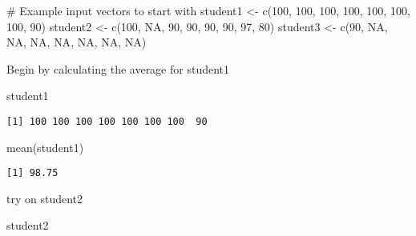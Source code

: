 \documentclass[
  letterpaper,
  DIV=11,
  numbers=noendperiod]{scrartcl}
\newenvironment{Shaded}{\begin{snugshade}}{\end{snugshade}}
\newcommand{\CommentTok}[1]{\textcolor[rgb]{0.37,0.37,0.37}{#1}}
\newcommand{\ConstantTok}[1]{\textcolor[rgb]{0.56,0.35,0.01}{#1}}
\newcommand{\DecValTok}[1]{\textcolor[rgb]{0.68,0.00,0.00}{#1}}
\newcommand{\FunctionTok}[1]{\textcolor[rgb]{0.28,0.35,0.67}{#1}}
\newcommand{\NormalTok}[1]{\textcolor[rgb]{0.00,0.23,0.31}{#1}}
\newcommand{\OtherTok}[1]{\textcolor[rgb]{0.00,0.23,0.31}{#1}}
\begin{document}
\begin{Shaded}
\begin{Highlighting}[]
\CommentTok{\# Example input vectors to start with}
\NormalTok{student1 }\OtherTok{\textless{}{-}} \FunctionTok{c}\NormalTok{(}\DecValTok{100}\NormalTok{, }\DecValTok{100}\NormalTok{, }\DecValTok{100}\NormalTok{, }\DecValTok{100}\NormalTok{, }\DecValTok{100}\NormalTok{, }\DecValTok{100}\NormalTok{, }\DecValTok{100}\NormalTok{, }\DecValTok{90}\NormalTok{)}
\NormalTok{student2 }\OtherTok{\textless{}{-}} \FunctionTok{c}\NormalTok{(}\DecValTok{100}\NormalTok{, }\ConstantTok{NA}\NormalTok{, }\DecValTok{90}\NormalTok{, }\DecValTok{90}\NormalTok{, }\DecValTok{90}\NormalTok{, }\DecValTok{90}\NormalTok{, }\DecValTok{97}\NormalTok{, }\DecValTok{80}\NormalTok{)}
\NormalTok{student3 }\OtherTok{\textless{}{-}} \FunctionTok{c}\NormalTok{(}\DecValTok{90}\NormalTok{, }\ConstantTok{NA}\NormalTok{, }\ConstantTok{NA}\NormalTok{, }\ConstantTok{NA}\NormalTok{, }\ConstantTok{NA}\NormalTok{, }\ConstantTok{NA}\NormalTok{, }\ConstantTok{NA}\NormalTok{, }\ConstantTok{NA}\NormalTok{)}
\end{Highlighting}
\end{Shaded}

Begin by calculating the average for student1

\begin{Shaded}
\begin{Highlighting}[]
\NormalTok{student1}
\end{Highlighting}
\end{Shaded}

\begin{verbatim}
[1] 100 100 100 100 100 100 100  90
\end{verbatim}

\begin{Shaded}
\begin{Highlighting}[]
\FunctionTok{mean}\NormalTok{(student1)}
\end{Highlighting}
\end{Shaded}

\begin{verbatim}
[1] 98.75
\end{verbatim}

try on student2

\begin{Shaded}
\begin{Highlighting}[]
\NormalTok{student2}
\end{Highlighting}
\end{Shaded}
\end{document}

